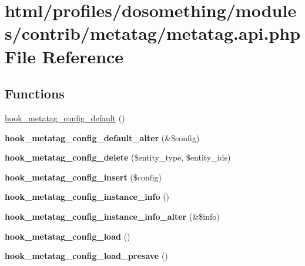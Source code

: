 \hypertarget{metatag_8api_8php}{
\section{html/profiles/dosomething/modules/contrib/metatag/metatag.api.php File Reference}
\label{metatag_8api_8php}
}
\subsection*{Functions}
\begin{DoxyCompactItemize}
\item 
\hyperlink{metatag_8api_8php_a4e5a48ac435a77ef5372964d28ad7c36}{hook\_\-metatag\_\-config\_\-default} ()
\item 
\hypertarget{metatag_8api_8php_a0ce314792aeb1c4aa3a7a5a47b6fb59d}{
{\bfseries hook\_\-metatag\_\-config\_\-default\_\-alter} (\&\$config)}
\label{metatag_8api_8php_a0ce314792aeb1c4aa3a7a5a47b6fb59d}

\item 
\hypertarget{metatag_8api_8php_a8e913237fe49c8e4c37e6d4f65f1f89e}{
{\bfseries hook\_\-metatag\_\-config\_\-delete} (\$entity\_\-type, \$entity\_\-ids)}
\label{metatag_8api_8php_a8e913237fe49c8e4c37e6d4f65f1f89e}

\item 
\hypertarget{metatag_8api_8php_aeef5b424233d73b977d4b4132332b4f5}{
{\bfseries hook\_\-metatag\_\-config\_\-insert} (\$config)}
\label{metatag_8api_8php_aeef5b424233d73b977d4b4132332b4f5}

\item 
\hypertarget{metatag_8api_8php_a1d342f68f7d1f5aec916f0ecd43d049d}{
{\bfseries hook\_\-metatag\_\-config\_\-instance\_\-info} ()}
\label{metatag_8api_8php_a1d342f68f7d1f5aec916f0ecd43d049d}

\item 
\hypertarget{metatag_8api_8php_a61785235b1fdeed05151076056f2a1fc}{
{\bfseries hook\_\-metatag\_\-config\_\-instance\_\-info\_\-alter} (\&\$info)}
\label{metatag_8api_8php_a61785235b1fdeed05151076056f2a1fc}

\item 
\hypertarget{metatag_8api_8php_ac2f5051419dd451d3b6be333531bc160}{
{\bfseries hook\_\-metatag\_\-config\_\-load} ()}
\label{metatag_8api_8php_ac2f5051419dd451d3b6be333531bc160}

\item 
\hypertarget{metatag_8api_8php_a8191f3adf23fb23130c0f4d5278f30d7}{
{\bfseries hook\_\-metatag\_\-config\_\-load\_\-presave} ()}
\label{metatag_8api_8php_a8191f3adf23fb23130c0f4d5278f30d7}


\end{DoxyCompactItemize}
